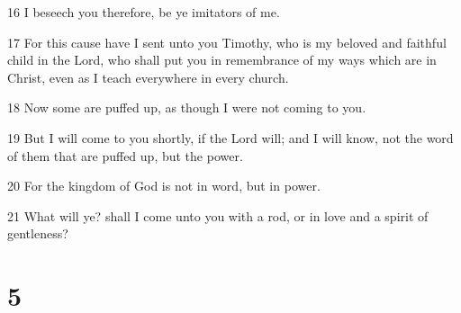 \par 16 I beseech you therefore, be ye imitators of me.
\par 17 For this cause have I sent unto you Timothy, who is my beloved and faithful child in the Lord, who shall put you in remembrance of my ways which are in Christ, even as I teach everywhere in every church.
\par 18 Now some are puffed up, as though I were not coming to you.
\par 19 But I will come to you shortly, if the Lord will; and I will know, not the word of them that are puffed up, but the power.
\par 20 For the kingdom of God is not in word, but in power.
\par 21 What will ye? shall I come unto you with a rod, or in love and a spirit of gentleness?

\chapter{5}

